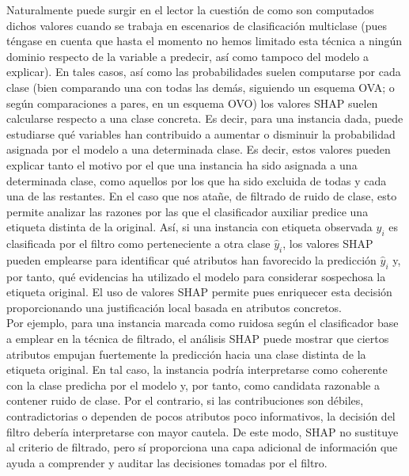 \documentclass[print, color]{ugrTFG}
\begin{document}
    Naturalmente puede surgir en el lector la cuestión de como son computados dichos valores cuando se trabaja en escenarios de clasificación multiclase (pues téngase en cuenta que hasta el momento no hemos limitado esta técnica a ningún dominio respecto de la variable a predecir, así como tampoco del modelo a explicar). En tales casos, así como las probabilidades suelen computarse por cada clase (bien comparando una con todas las demás, siguiendo un esquema OVA; o según comparaciones a pares, en un esquema OVO) los valores SHAP suelen calcularse respecto a una clase concreta. Es decir, para una instancia dada, puede estudiarse qué variables han contribuido a aumentar o disminuir la probabilidad asignada por el modelo a una determinada clase. Es decir, estos valores pueden explicar tanto el motivo por el que una instancia ha sido asignada a una determinada clase, como aquellos por los que ha sido excluida de todas y cada una de las restantes. En el caso que nos atañe, de filtrado de ruido de clase, esto permite analizar las razones por las que el clasificador auxiliar predice una etiqueta distinta de la original. Así, si una instancia con etiqueta observada $y_i$ es clasificada por el filtro como perteneciente a otra clase $\hat{y}_i$, los valores SHAP pueden emplearse para identificar qué atributos han favorecido la predicción $\hat{y}_i$ y, por tanto, qué evidencias ha utilizado el modelo para considerar sospechosa la etiqueta original. El uso de valores SHAP permite pues enriquecer esta decisión proporcionando una justificación local basada en atributos concretos.\\
    
    Por ejemplo, para una instancia marcada como ruidosa según el clasificador base a emplear en la técnica de filtrado, el análisis SHAP puede mostrar que ciertos atributos empujan fuertemente la predicción hacia una clase distinta de la etiqueta original. En tal caso, la instancia podría interpretarse como coherente con la clase predicha por el modelo y, por tanto, como candidata razonable a contener ruido de clase. Por el contrario, si las contribuciones son débiles, contradictorias o dependen de pocos atributos poco informativos, la decisión del filtro debería interpretarse con mayor cautela. De este modo, SHAP no sustituye al criterio de filtrado, pero sí proporciona una capa adicional de información que ayuda a comprender y auditar las decisiones tomadas por el filtro.\\
    
\end{document}
